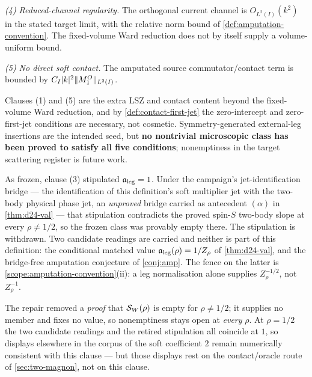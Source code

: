 \begin{definition}
\emph{(4) Reduced-channel regularity.} The orthogonal current channel is
$O_{L^2(I)}(k^2)$ in the stated target limit, with the relative norm bound of
\cref{def:amputation-convention}. The fixed-volume Ward reduction does not by
itself supply a volume-uniform bound.

\emph{(5) No direct soft contact.} The amputated source commutator/contact
term is bounded by $C_I\lvert k\rvert^2\lVert M_1^O\rVert_{L^2(I)}$.
\end{definition}

\begin{scope}
\label{scope:no-contact-class}
Clauses (1) and (5) are the extra LSZ and contact content beyond the
fixed-volume Ward reduction, and by \cref{def:contact-first-jet} the
zero-intercept and zero-first-jet conditions are necessary, not cosmetic.
Symmetry-generated external-leg insertions are the intended seed, but
\textbf{no nontrivial microscopic class has been proved to satisfy all five
conditions}; nonemptiness in the target scattering register is future work.

As frozen, clause (3) stipulated $\mathfrak{a}_{\mathrm{leg}}=1$. Under the campaign's
jet-identification bridge --- the identification of this definition's soft
multiplier jet with the two-body physical phase jet, an \emph{unproved} bridge
carried as antecedent $(\alpha)$ in \cref{thm:d24-val} --- that stipulation
contradicts the proved spin-$S$ two-body slope at every $\rho\neq1/2$, so the
frozen class was provably empty there. The stipulation is withdrawn. Two
candidate readings are carried and neither is part of this definition: the
conditional matched value $\mathfrak{a}_{\mathrm{leg}}(\rho)=1/Z_\rho$ of \cref{thm:d24-val}, and
the bridge-free amputation conjecture of \cref{conj:amp}. The fence on the
latter is \cref{scope:amputation-convention}(ii): a leg normalisation alone
supplies $Z_\rho^{-1/2}$, not $Z_\rho^{-1}$.

The repair removed a \emph{proof} that $\mathcal{S}_W(\rho)$ is empty for
$\rho\neq1/2$; it supplies no member and fixes no value, so nonemptiness stays
open at \emph{every} $\rho$. At $\rho=1/2$ the two candidate readings and the
retired stipulation all coincide at $1$, so displays elsewhere in the corpus
of the soft coefficient $2$ remain numerically consistent with this clause ---
but those displays rest on the contact/oracle route of \cref{sec:two-magnon},
not on this clause.
\end{scope}

